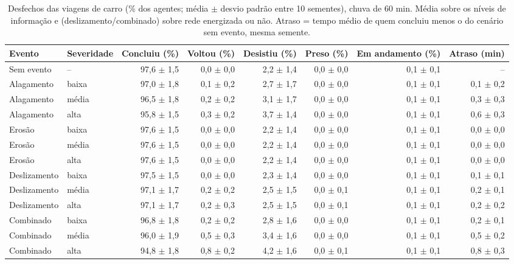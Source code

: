 \begin{table}[htbp]
\centering
\scriptsize
\caption{Desfechos das viagens de carro (\% dos agentes; média $\pm$ desvio padrão entre 10 sementes), chuva de 60 min. Média sobre os níveis de informação e (deslizamento/combinado) sobre rede energizada ou não. Atraso = tempo médio de quem concluiu menos o do cenário sem evento, mesma semente.}
\label{tab:t1_60_carro}
\begin{tabular}{llrrrrrr}
\toprule
Evento & Severidade & Concluiu (\%) & Voltou (\%) & Desistiu (\%) & Preso (\%) & Em andamento (\%) & Atraso (min) \\
\midrule
Sem evento & -- & 97,6 $\pm$ 1,5 & 0,0 $\pm$ 0,0 & 2,2 $\pm$ 1,4 & 0,0 $\pm$ 0,0 & 0,1 $\pm$ 0,1 & -- \\
Alagamento & baixa & 97,0 $\pm$ 1,8 & 0,1 $\pm$ 0,2 & 2,7 $\pm$ 1,7 & 0,0 $\pm$ 0,0 & 0,1 $\pm$ 0,1 & 0,1 $\pm$ 0,2 \\
Alagamento & média & 96,5 $\pm$ 1,8 & 0,2 $\pm$ 0,2 & 3,1 $\pm$ 1,7 & 0,0 $\pm$ 0,0 & 0,1 $\pm$ 0,1 & 0,3 $\pm$ 0,3 \\
Alagamento & alta & 95,8 $\pm$ 1,5 & 0,3 $\pm$ 0,2 & 3,7 $\pm$ 1,4 & 0,0 $\pm$ 0,0 & 0,1 $\pm$ 0,1 & 0,6 $\pm$ 0,3 \\
Erosão & baixa & 97,6 $\pm$ 1,5 & 0,0 $\pm$ 0,0 & 2,2 $\pm$ 1,4 & 0,0 $\pm$ 0,0 & 0,1 $\pm$ 0,1 & 0,0 $\pm$ 0,0 \\
Erosão & média & 97,6 $\pm$ 1,5 & 0,0 $\pm$ 0,0 & 2,2 $\pm$ 1,4 & 0,0 $\pm$ 0,0 & 0,1 $\pm$ 0,1 & 0,0 $\pm$ 0,0 \\
Erosão & alta & 97,6 $\pm$ 1,5 & 0,0 $\pm$ 0,0 & 2,2 $\pm$ 1,4 & 0,0 $\pm$ 0,0 & 0,1 $\pm$ 0,1 & 0,0 $\pm$ 0,0 \\
Deslizamento & baixa & 97,5 $\pm$ 1,5 & 0,0 $\pm$ 0,0 & 2,3 $\pm$ 1,4 & 0,0 $\pm$ 0,0 & 0,1 $\pm$ 0,1 & 0,1 $\pm$ 0,1 \\
Deslizamento & média & 97,1 $\pm$ 1,7 & 0,2 $\pm$ 0,2 & 2,5 $\pm$ 1,5 & 0,0 $\pm$ 0,1 & 0,1 $\pm$ 0,1 & 0,2 $\pm$ 0,1 \\
Deslizamento & alta & 97,1 $\pm$ 1,7 & 0,2 $\pm$ 0,3 & 2,5 $\pm$ 1,5 & 0,0 $\pm$ 0,1 & 0,1 $\pm$ 0,1 & 0,2 $\pm$ 0,2 \\
Combinado & baixa & 96,8 $\pm$ 1,8 & 0,2 $\pm$ 0,2 & 2,8 $\pm$ 1,6 & 0,0 $\pm$ 0,0 & 0,1 $\pm$ 0,1 & 0,2 $\pm$ 0,1 \\
Combinado & média & 96,0 $\pm$ 1,9 & 0,5 $\pm$ 0,3 & 3,4 $\pm$ 1,6 & 0,0 $\pm$ 0,0 & 0,1 $\pm$ 0,1 & 0,5 $\pm$ 0,2 \\
Combinado & alta & 94,8 $\pm$ 1,8 & 0,8 $\pm$ 0,2 & 4,2 $\pm$ 1,6 & 0,0 $\pm$ 0,1 & 0,1 $\pm$ 0,1 & 0,8 $\pm$ 0,3 \\
\bottomrule
\end{tabular}
\end{table}
